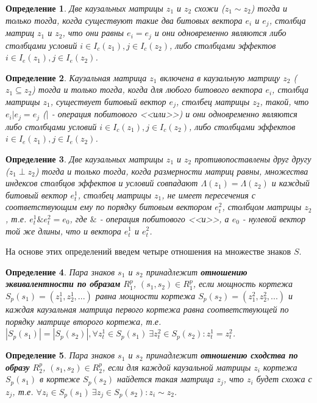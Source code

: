 \documentclass[12pt]{scrartcl}
\newtheorem{definition}{Определение}
\begin{document}
	\begin{definition}
		Две каузальных матрицы $z_1$ и $z_2$ схожи ($z_1\sim z_2$) тогда и только тогда, когда  существуют такие два битовых вектора $e_i$ и $e_j$, столбца матриц $z_1$ и $z_2$, что они равны $e_i=e_j$ и они одновременно являются либо столбцами условий $i\in I_c(z_1), j\in I_c(z_2)$, либо столбцами эффектов $i\in I_e(z_1), j\in I_e(z_2)$.
	\end{definition}
	
	\begin{definition}
		Каузальная матрица $z_1$ включена в каузальную матрицу $z_2$ ($z_1\subseteq z_2$) тогда и только тогда, когда  для любого битового вектора $e_i$, столбца матрицы $z_1$, существует битовый вектор $e_j$, столбец матрицы $z_2$, такой, что $e_i | e_j=e_j$ ($|$ - операция побитового <<или>>) и они одновременно являются либо столбцами условий $i\in I_c(z_1), j\in I_c(z_2)$, либо столбцами эффектов $i\in I_e(z_1), j\in I_e(z_2)$.
	\end{definition}
	
	\begin{definition}
		Две каузальных матрицы $z_1$ и $z_2$ противопоставлены друг другу ($z_1\perp z_2$) тогда и только тогда, когда размерности матриц равны, множества индексов столбцов эффектов и условий совпадают $\Lambda({z_1})=\Lambda({z_2})$ и каждый битовый вектор $e_t^1$, столбец матрицы $z_1$, не имеет пересечения с соответствующим ему по порядку битовым вектором $e_t^2$, столбцом матрицы $z_2$, т.е. $e_t^1\& e_t^2=e_0$, где $\&$ - операция побитового <<и>>, а $e_0$ - нулевой вектор той же длины, что и вектора $e_t^1$ и $e_t^2$.
	\end{definition}
	
	На основе этих определений введем четыре отношения на множестве знаков $S$.
	\begin{definition}
		Пара знаков  $s_1$ и $s_2$ принадлежит \textbf{отношению эквивалентности по образам} $R_1^p$, $(s_1,s_2)\in R_1^p$, если мощность кортежа $S_p(s_1)=(z_1^1,z_2^1,...)$ равна мощности кортежа $S_p(s_2)=(z_1^2,z_2^2,...)$ и каждая каузальная матрица первого кортежа равна соответствующей по порядку матрице второго кортежа, т.е. $|S_p(s_1)| = |S_p(s_2)|, \forall z_t^1\in S_p(s_1)\ \exists z_t^2\in S_p(s_2): z_t^1=z_t^2$.
	\end{definition}
	
	\begin{definition}
		Пара знаков  $s_1$ и $s_2$ принадлежит \textbf{отношению сходства по образу} $R_2^p$, $(s_1,s_2)\in R_2^p$, если для каждой каузальной матрицы $z_i$ кортежа $S_p(s_1)$ в кортеже $S_p(s_2)$ найдется такая матрица $z_j$, что $z_i$ будет схожа с $z_j$, т.е. $\forall z_i\in S_p(s_1)\ \exists z_j\in S_p(s_2): z_i\sim z_2$.
	\end{definition}
	
\end{document}
